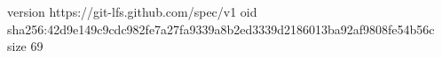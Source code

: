 version https://git-lfs.github.com/spec/v1
oid sha256:42d9e149c9cdc982fe7a27fa9339a8b2ed3339d2186013ba92af9808fe54b56c
size 69
